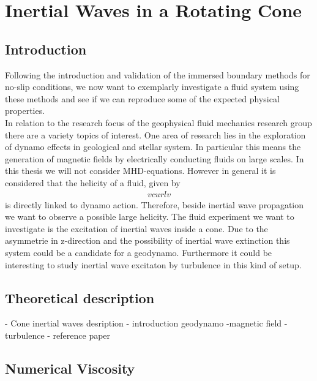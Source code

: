 \chapter{Inertial Waves in a Rotating Cone}

\section{Introduction}

Following the introduction and validation of the immersed boundary methods for no-slip conditions,
we now want to exemplarly investigate a fluid system using these methods
and see if we can reproduce some of the expected physical properties.\\
In relation to the research focus of the geophysical fluid mechanics research group there are a variety
topics of interest.
One area of research lies in the exploration of dynamo effects in geological and stellar system.
In particular this means the generation of magnetic fields by electrically conducting fluids on large scales.
In this thesis we will not consider MHD-equations.
However in general it is considered that the helicity of a fluid, given by
\begin{align}
    v curl v
\end{align}
is directly linked to dynamo action.
Therefore, beside inertial wave propagation we want to observe a possible large helicity.
The fluid experiment we want to investigate is the excitation of inertial waves inside a cone.
Due to the asymmetrie in z-direction and the possibility of inertial wave extinction
this system could be a candidate for a geodynamo. Furthermore it could be interesting to
study inertial wave excitaton by turbulence in this kind of setup.

\section{Theoretical description}



- Cone inertial waves desription
- introduction geodynamo
-magnetic field
- turbulence
- reference paper


\section{Numerical Viscosity}
